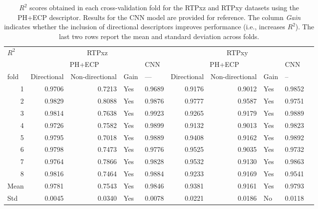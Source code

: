 \begin{table}[]
\caption{$R^2$ scores obtained in each cross-validation fold for the RTPxz and RTPxy datasets using the PH+ECP descriptor. Results for the CNN model are provided for reference. The column \textit{Gain} indicates whether the inclusion of directional descriptors improves performance (i.e., increases $R^2$). The last two rows report the mean and standard deviation across folds.}
\label{tab:fold_r2}
\begin{tabular}{r|rrlr|rrlrr}
\hline
\multicolumn{1}{l|}{$R^2$} & \multicolumn{4}{c|}{RTPxz} & \multicolumn{4}{c}{RTPxy} & \multicolumn{1}{l}{} \\
\multicolumn{1}{l|}{} & \multicolumn{3}{c}{PH+ECP} & \multicolumn{1}{l|}{CNN} & \multicolumn{3}{c}{PH+ECP} & \multicolumn{1}{l}{CNN} & \multicolumn{1}{l}{} \\
\multicolumn{1}{l|}{fold} & \multicolumn{1}{l}{Directional} & \multicolumn{1}{l}{Non-directional} & Gain & \multicolumn{1}{l|}{---} & \multicolumn{1}{l}{Directional} & \multicolumn{1}{l}{Non-directional} & Gain & \multicolumn{1}{l}{--} &  \\ \hline
1 & 0.9706 & 0.7213 & Yes & 0.9689 & 0.9176 & 0.9012 & Yes & 0.9852 &  \\
2 & 0.9829 & 0.8088 & Yes & 0.9876 & 0.9777 & 0.9587 & Yes & 0.9751 &  \\
3 & 0.9814 & 0.7638 & Yes & 0.9923 & 0.9265 & 0.9179 & Yes & 0.9889 &  \\
4 & 0.9726 & 0.7582 & Yes & 0.9899 & 0.9132 & 0.9013 & Yes & 0.9823 &  \\
5 & 0.9795 & 0.7018 & Yes & 0.9889 & 0.9408 & 0.9162 & Yes & 0.9892 &  \\
6 & 0.9798 & 0.7473 & Yes & 0.9776 & 0.9525 & 0.9035 & Yes & 0.9732 &  \\
7 & 0.9764 & 0.7866 & Yes & 0.9828 & 0.9532 & 0.9130 & Yes & 0.9863 &  \\
8 & 0.9816 & 0.7464 & Yes & 0.9884 & 0.9233 & 0.9169 & Yes & 0.9541 &  \\ \hline
\multicolumn{1}{l|}{Mean} & 0.9781 & 0.7543 & Yes & 0.9846 & 0.9381 & 0.9161 & Yes & 0.9793 &  \\
\multicolumn{1}{l|}{Std} & 0.0045 & 0.0340 & Yes & 0.0078 & 0.0221 & 0.0186 & No & 0.0118 &  \\ \hline
\end{tabular}
\end{table}


